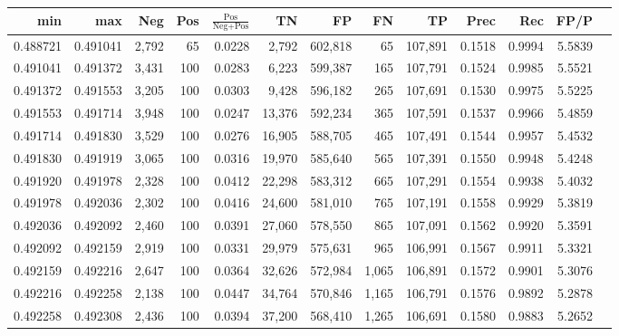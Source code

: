 \begin{tabular}{rrrrrrrrrrrrr}
\toprule
     min &      max &   Neg & Pos & $\frac{\text{Pos}}{\text{Neg}+\text{Pos}}$ &      TN &      FP &      FN &      TP &   Prec &    Rec &   FP/P \\
\midrule
0.488721 & 0.491041 & 2,792 &  65 &                                     0.0228 &   2,792 & 602,818 &      65 & 107,891 & 0.1518 & 0.9994 & 5.5839 \\
0.491041 & 0.491372 & 3,431 & 100 &                                     0.0283 &   6,223 & 599,387 &     165 & 107,791 & 0.1524 & 0.9985 & 5.5521 \\
0.491372 & 0.491553 & 3,205 & 100 &                                     0.0303 &   9,428 & 596,182 &     265 & 107,691 & 0.1530 & 0.9975 & 5.5225 \\
0.491553 & 0.491714 & 3,948 & 100 &                                     0.0247 &  13,376 & 592,234 &     365 & 107,591 & 0.1537 & 0.9966 & 5.4859 \\
0.491714 & 0.491830 & 3,529 & 100 &                                     0.0276 &  16,905 & 588,705 &     465 & 107,491 & 0.1544 & 0.9957 & 5.4532 \\
0.491830 & 0.491919 & 3,065 & 100 &                                     0.0316 &  19,970 & 585,640 &     565 & 107,391 & 0.1550 & 0.9948 & 5.4248 \\
0.491920 & 0.491978 & 2,328 & 100 &                                     0.0412 &  22,298 & 583,312 &     665 & 107,291 & 0.1554 & 0.9938 & 5.4032 \\
0.491978 & 0.492036 & 2,302 & 100 &                                     0.0416 &  24,600 & 581,010 &     765 & 107,191 & 0.1558 & 0.9929 & 5.3819 \\
0.492036 & 0.492092 & 2,460 & 100 &                                     0.0391 &  27,060 & 578,550 &     865 & 107,091 & 0.1562 & 0.9920 & 5.3591 \\
0.492092 & 0.492159 & 2,919 & 100 &                                     0.0331 &  29,979 & 575,631 &     965 & 106,991 & 0.1567 & 0.9911 & 5.3321 \\
0.492159 & 0.492216 & 2,647 & 100 &                                     0.0364 &  32,626 & 572,984 &   1,065 & 106,891 & 0.1572 & 0.9901 & 5.3076 \\
0.492216 & 0.492258 & 2,138 & 100 &                                     0.0447 &  34,764 & 570,846 &   1,165 & 106,791 & 0.1576 & 0.9892 & 5.2878 \\
0.492258 & 0.492308 & 2,436 & 100 &                                     0.0394 &  37,200 & 568,410 &   1,265 & 106,691 & 0.1580 & 0.9883 & 5.2652 \\

\end{tabular}
